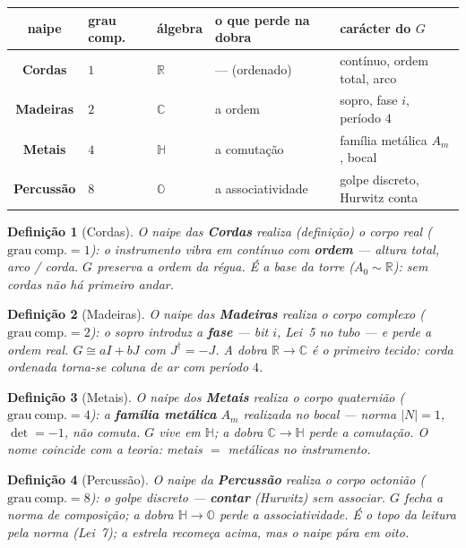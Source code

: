 \documentclass[11pt,a4paper]{article}
\newtheorem{definicao}{Definição}
\begin{document}
\begin{center}\small
\begin{tabular}{@{}cllll@{}}
naipe & grau comp. & álgebra & o que perde na dobra & carácter do $G$ \\
\hline
\textbf{Cordas} & $1$ & $\mathbb{R}$ & --- (ordenado) & contínuo, ordem total, arco \\
\textbf{Madeiras} & $2$ & $\mathbb{C}$ & a ordem & sopro, fase $i$, período $4$ \\
\textbf{Metais} & $4$ & $\mathbb{H}$ & a comutação & família metálica $A_m$, bocal \\
\textbf{Percussão} & $8$ & $\mathbb{O}$ & a associatividade & golpe discreto, Hurwitz conta \\
\end{tabular}
\end{center}

\begin{definicao}[Cordas]\label{def:cordas}
O naipe das \textbf{Cordas} \emph{realiza} (definição) o corpo real ($\mathrm{grau\ comp.}=1$): o
instrumento vibra em contínuo com \textbf{ordem} --- altura total,
arco / corda. $G$ preserva a ordem da régua. É a base da torre
($A_0\sim\mathbb{R}$): sem cordas não há primeiro andar.
\end{definicao}

\begin{definicao}[Madeiras]\label{def:madeiras}
O naipe das \textbf{Madeiras} \emph{realiza} o corpo complexo ($\mathrm{grau\ comp.}=2$): o
sopro introduz a \textbf{fase} --- bit $i$, Lei~5 no tubo --- e perde a
ordem real. $G\cong aI+bJ$ com $J^{\dagger}=-J$. A dobra
$\mathbb{R}\to\mathbb{C}$ é o primeiro tecido: corda ordenada torna-se
coluna de ar com período $4$.
\end{definicao}

\begin{definicao}[Metais]\label{def:metais}
O naipe dos \textbf{Metais} \emph{realiza} o corpo quaternião ($\mathrm{grau\ comp.}=4$): a
\textbf{família metálica} $A_m$ realizada no bocal --- norma
$|N|=1$, $\det=-1$, não comuta. $G$ vive em $\mathbb{H}$; a dobra
$\mathbb{C}\to\mathbb{H}$ perde a comutação. O nome coincide com a
teoria: metais $=$ metálicas no instrumento.
\end{definicao}

\begin{definicao}[Percussão]\label{def:percussao}
O naipe da \textbf{Percussão} \emph{realiza} o corpo octonião ($\mathrm{grau\ comp.}=8$): o
golpe discreto --- \textbf{contar} (Hurwitz) sem associar. $G$ fecha a
norma de composição; a dobra $\mathbb{H}\to\mathbb{O}$ perde a
associatividade. É o topo da leitura pela norma (Lei~7); a estrela
recomeça acima, mas o naipe pára em oito.
\end{definicao}
\end{document}
